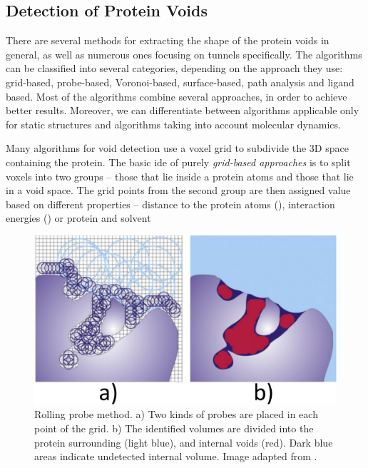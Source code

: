 \subsection{Detection of Protein Voids}
There are several methods for extracting the shape of the protein voids in general, as well as numerous ones focusing on tunnels specifically. The algorithms can be classified into several categories, depending on the approach they use: grid-based, probe-based, Voronoi-based, surface-based, path analysis and ligand based. Most of the algorithms combine several approaches, in order to achieve better results. Moreover, we can differentiate  between algorithms applicable only for static structures and algorithms taking into account molecular dynamics.

Many algorithms for void detection use a voxel grid to subdivide the 3D space containing the protein. The basic ide of purely \textit{grid-based approaches} is to split voxels into two groups -- those that lie inside a protein atoms and those that lie in a void space. 
The grid points from the second group are then assigned value based on different properties -- distance to the protein atoms (\cite{levitt1992pocket, Petrek2006Caver, hendlich1997ligsite}), interaction energies (\cite{an2005pocketome, laurie2005q, hernandez2009sitehound}) or protein and solvent 
\begin{figure}
\vspace{-17pt}
  \begin{center}
  \includegraphics[width=\linewidth]{pictures/rollingprobe.pdf} 
  \caption{Rolling probe method. a) Two kinds of probes are placed in each point of the grid. b) The identified volumes are divided into the protein surrounding (light blue), and internal voids (red). Dark blue areas indicate undetected internal volume. Image adapted from \cite{brezovsky2013software}.}
  \label{Fig:rollingprobe}  
	\end{center}
  \vspace{-25pt}
\end{figure}

